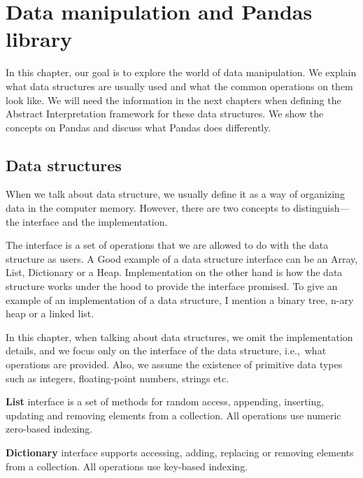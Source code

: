 \chapter{Data manipulation and Pandas library}

In this chapter, our goal is to explore the world of data manipulation.
We explain what data structures are usually used and what the common operations on them look like.
We will need the information in the next chapters when defining the Abstract Interpretation framework for these data
structures.
We show the concepts on Pandas and discuss what Pandas does differently.

\section{Data structures} %

When we talk about data structure, we usually define it as a way of organizing data in the computer memory.
However, there are two concepts to distinguish---the interface and the implementation.

The interface is a set of operations that we are allowed to do with the data structure as users.
A Good example of a data structure interface can be an Array, List, Dictionary or a Heap.
Implementation on the other hand is how the data structure works under the hood to provide the interface promised.
To give an example of an implementation of a data structure, I mention a binary tree, n-ary heap or a linked list.

In this chapter, when talking about data structures, we omit the implementation details, and we focus only on the
interface of the data structure, i.e.,~what operations are provided.
Also, we assume the existence of primitive data types such as integers, floating-point numbers, strings etc.

\begin{defn}
    \textbf{List} interface is a set of methods for random access, appending, inserting, updating and removing elements
    from a collection.
    All operations use numeric zero-based indexing.
\end{defn}

\begin{defn}
    \textbf{Dictionary} interface supports accessing, adding, replacing or removing elements from a collection.
    All operations use key-based indexing.
\end{defn}

